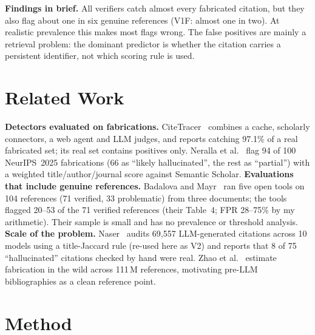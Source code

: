 \documentclass[conference]{IEEEtran}
\begin{document}
\textbf{Findings in brief.} All verifiers catch almost every fabricated citation, but they also flag
about one in six genuine references (V1F: almost one in two). At realistic prevalence this makes most flags
wrong. The false positives are mainly a retrieval problem: the dominant predictor is whether the
citation carries a persistent identifier, not which scoring rule is used.

\section{Related Work}
\textbf{Detectors evaluated on fabrications.} CiteTracer~\cite{li2026citetracer} combines a cache,
scholarly connectors, a web agent and LLM judges, and reports catching 97.1\% of a real
fabricated set; its real set contains positives only. Neralla et al.~\cite{neralla2026} flag
94 of 100 NeurIPS~2025 fabrications (66 as ``likely hallucinated'', the rest as ``partial'') with a
weighted title/author/journal score against Semantic Scholar.
\textbf{Evaluations that include genuine references.} Badalova and Mayr~\cite{badalova2026} ran
five open tools on 104 references (71 verified, 33 problematic) from three documents; the tools
flagged 20--53 of the 71 verified references (their Table~4; FPR 28--75\% by my arithmetic). Their
sample is small and has no prevalence or threshold analysis.
\textbf{Scale of the problem.} Naser~\cite{naser2026} audits 69,557 LLM-generated citations
across 10 models using a title-Jaccard rule (re-used here as V2) and reports that 8 of 75
``hallucinated'' citations checked by hand were real. Zhao et al.~\cite{zhao2026} estimate
fabrication in the wild across 111\,M references, motivating pre-LLM bibliographies as a clean
reference point.

\section{Method}
\end{document}

